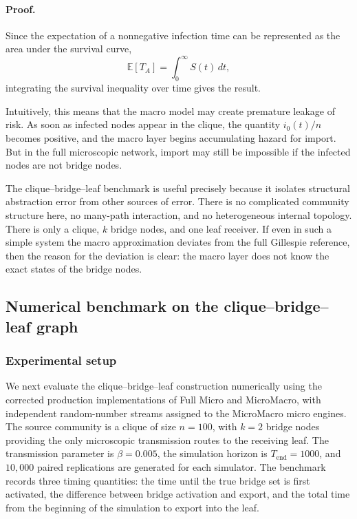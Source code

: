 \documentclass[a4paper,fleqn]{cas-sc}
\begin{document}
\paragraph{Proof.}
Since the expectation of a nonnegative infection time can be represented as the area under the survival curve,
\[
\mathbb{E}[T_A]
=
\int_0^\infty S(t)\,dt,
\]
integrating the survival inequality over time gives the result.

Intuitively, this means that the macro model may create premature leakage of risk. As soon as infected nodes appear in the clique, the quantity \(i_0(t)/n\) becomes positive, and the macro layer begins accumulating hazard for import. But in the full microscopic network, import may still be impossible if the infected nodes are not bridge nodes.

The clique--bridge--leaf benchmark is useful precisely because it isolates structural abstraction error from other sources of error. There is no complicated community structure here, no many-path interaction, and no heterogeneous internal topology. There is only a clique, \(k\) bridge nodes, and one leaf receiver. If even in such a simple system the macro approximation deviates from the full Gillespie reference, then the reason for the deviation is clear: the macro layer does not know the exact states of the bridge nodes.



\subsection{Numerical benchmark on the clique--bridge--leaf graph}
\label{sec:clique_leaf_numerical}

\subsubsection{Experimental setup}

We next evaluate the clique--bridge--leaf construction numerically using the corrected production implementations of Full Micro and MicroMacro, with independent random-number streams assigned to the MicroMacro micro engines. The source community is a clique of size $n=100$, with $k=2$ bridge nodes providing the only microscopic transmission routes to the receiving leaf. The transmission parameter is $\beta=0.005$, the simulation horizon is $T_{\mathrm{end}}=1000$, and $10{,}000$ paired replications are generated for each simulator. The benchmark records three timing quantities: the time until the true bridge set is first activated, the difference between bridge activation and export, and the total time from the beginning of the simulation to export into the leaf.
\end{document}
